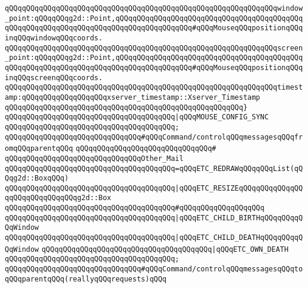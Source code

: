 \verb|qQQqqQQqqQQqqQQqqQQqqQQqqQQqqQQqqQQqqQQqqQQqqQQqqQQqqQQqqQQqqQQqwindow_point:qQQqqQQqg2d::Point,qQQqqQQqqQQqqQQqqQQqqQQqqQQqqQQqqQQqqQQqqQQqqQQqqQQqqQQqqQQqqQQqqQQqqQQqqQQqqQQqqQQqqQQq#qQQqMouseqQQqpositionqQQqinqQQqwindowqQQqcoords.|\newline
\verb|qQQqqQQqqQQqqQQqqQQqqQQqqQQqqQQqqQQqqQQqqQQqqQQqqQQqqQQqqQQqqQQqscreen_point:qQQqqQQqg2d::Point,qQQqqQQqqQQqqQQqqQQqqQQqqQQqqQQqqQQqqQQqqQQqqQQqqQQqqQQqqQQqqQQqqQQqqQQqqQQqqQQqqQQqqQQq#qQQqMouseqQQqpositionqQQqinqQQqscreenqQQqcoords.|\newline
\verb|qQQqqQQqqQQqqQQqqQQqqQQqqQQqqQQqqQQqqQQqqQQqqQQqqQQqqQQqqQQqqQQqtimestamp:qQQqqQQqqQQqqQQqqQQqxserver_timestamp::Xserver_Timestamp|\newline
\verb|qQQqqQQqqQQqqQQqqQQqqQQqqQQqqQQqqQQqqQQqqQQqqQQqqQQqqQQq}|\newline
\newline
\verb|qQQqqQQqqQQqqQQqqQQqqQQqqQQqqQQqqQQqqQQq|\verb#|qQQqMOUSE_CONFIG_SYNC#\newline
\verb|qQQqqQQqqQQqqQQqqQQqqQQqqQQqqQQqqQQqqQQq;|\newline
\newline
\newline
\verb|qQQqqQQqqQQqqQQqqQQqqQQqqQQqqQQq#qQQqCommand/controlqQQqmessagesqQQqfromqQQqparentqQQq|\newline
\verb|qQQqqQQqqQQqqQQqqQQqqQQqqQQqqQQq#|\newline
\verb|qQQqqQQqqQQqqQQqqQQqqQQqqQQqqQQqOther_Mail|\newline
\verb|qQQqqQQqqQQqqQQqqQQqqQQqqQQqqQQqqQQqqQQq=qQQqETC_REDRAWqQQqqQQqList(qQQqg2d::BoxqQQq)|\newline
\verb|qQQqqQQqqQQqqQQqqQQqqQQqqQQqqQQqqQQqqQQq|\verb#|qQQqETC_RESIZEqQQqqQQqqQQqqQQqqQQqqQQqqQQqqQQqg2d::Box#\newline
\verb|qQQqqQQqqQQqqQQqqQQqqQQqqQQqqQQqqQQqqQQq#qQQqqQQqqQQqqQQqqQQq|\newline
\verb|qQQqqQQqqQQqqQQqqQQqqQQqqQQqqQQqqQQqqQQq|\verb#|qQQqETC_CHILD_BIRTHqQQqqQQqqQQqWindow#\newline
\verb|qQQqqQQqqQQqqQQqqQQqqQQqqQQqqQQqqQQqqQQq|\verb#|qQQqETC_CHILD_DEATHqQQqqQQqqQQqWindow#\newline
\verb|qQQqqQQqqQQqqQQqqQQqqQQqqQQqqQQqqQQqqQQq|\verb#|qQQqETC_OWN_DEATH#\newline
\verb|qQQqqQQqqQQqqQQqqQQqqQQqqQQqqQQqqQQqqQQq;|\newline
\newline
\verb|qQQqqQQqqQQqqQQqqQQqqQQqqQQqqQQq#qQQqCommand/controlqQQqmessagesqQQqtoqQQqparentqQQq(reallyqQQqrequests)qQQq|\newline
